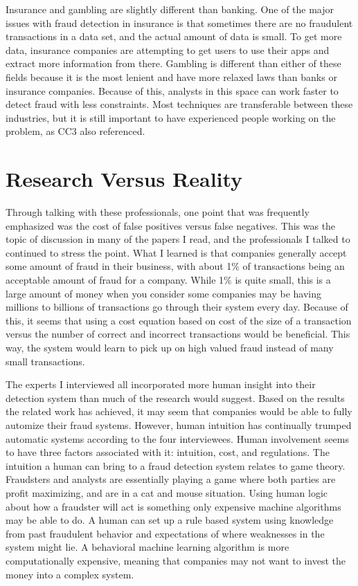 \documentclass[midd]{thesis}
\begin{document}
Insurance and gambling are slightly different than banking. One of the major issues with fraud detection in insurance is that sometimes there are no fraudulent transactions in a data set, and the actual amount of data is small. To get more data, insurance companies are attempting to get users to use their apps and extract more information from there. Gambling is different than either of these fields because it is the most lenient and have more relaxed laws than banks or insurance companies. Because of this, analysts in this space can work faster to detect fraud with less constraints. Most techniques are transferable between these industries, but it is still important to have experienced people working on the problem, as CC3 also referenced. 


\section{ Research Versus Reality}

Through talking with these professionals, one point that was frequently emphasized was the cost of false positives versus false negatives. This was the topic of discussion in many of the papers I read, and the professionals I talked to continued to stress the point. What I learned is that companies generally accept some amount of fraud in their business, with about 1\% of transactions being an acceptable amount of fraud for a company. While 1\% is quite small, this is a large amount of money when you consider some companies may be having millions to billions of transactions go through their system every day. Because of this, it seems that using a cost equation based on cost of the size of a transaction versus the number of correct and incorrect transactions would be beneficial. This way, the system would learn to pick up on high valued fraud instead of many small transactions.

The experts I interviewed all incorporated more human insight into their detection system than much of the research would suggest. Based on the results the related work has achieved, it may seem that companies would be able to fully automize their fraud systems. However, human intuition has continually trumped automatic systems according to the four interviewees. Human involvement seems to have three factors associated with it: intuition, cost, and regulations. The intuition a human can bring to a fraud detection system relates to game theory. Fraudsters and analysts are essentially playing a game where both parties are profit maximizing, and are in a cat and mouse situation. Using human logic about how a fraudster will act is something only expensive machine algorithms may be able to do. A human can set up a rule based system using knowledge from past fraudulent behavior and expectations of where weaknesses in the system might lie. A behavioral machine learning algorithm is more computationally expensive, meaning that companies may not want to invest the money into a complex system. 
\end{document}
